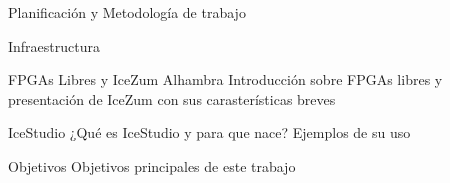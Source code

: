 \documentclass{beamer}
\begin{document}
\begin{frame}{Planificación y Metodología de trabajo}
\begin{figure}[H]
	\center	
\end{figure}
\end{frame}


\begin{frame}{Infraestructura}
	
\end{frame}

\begin{frame}{FPGAs Libres y IceZum Alhambra}
Introducción sobre FPGAs libres y presentación de IceZum con sus carasterísticas breves
\end{frame}
\begin{frame}{IceStudio}
¿Qué es IceStudio y para que nace? Ejemplos de su uso
\end{frame}
\begin{frame}{Objetivos}
Objetivos principales de este trabajo
\end{frame}
\end{document}
